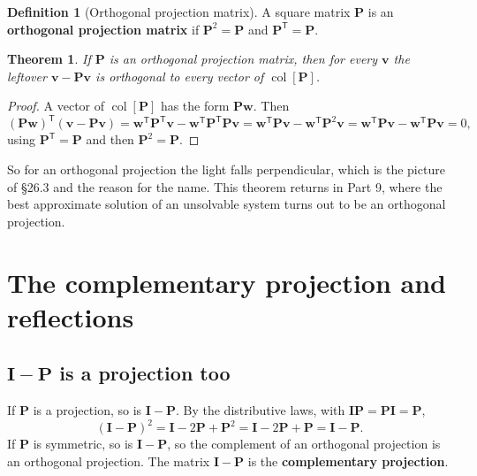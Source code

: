 \documentclass[11pt]{article}
\theoremstyle{plain}
\newtheorem{thm}{Theorem}[section]
\theoremstyle{definition}
\newtheorem{defn}{Definition}[section]
\theoremstyle{remark}
\newcommand{\vc}[1]{\mathbf{#1}}
\newcommand{\mt}[1]{\mathbf{#1}}
\newcommand{\T}{^{\mathsf{T}}}
\newcommand{\colsp}[1]{\operatorname{col}[#1]}
\begin{document}
\begin{defn}[Orthogonal projection matrix]
A square matrix $\mt{P}$ is an \textbf{orthogonal projection matrix} if
$\mt{P}^{2}=\mt{P}$ and $\mt{P}\T=\mt{P}$.
\end{defn}

\begin{thm}
\label{thm:orthproj}
If $\mt{P}$ is an orthogonal projection matrix, then for every $\vc{v}$ the
leftover $\vc{v}-\mt{P}\vc{v}$ is orthogonal to every vector of
$\colsp{\mt{P}}$.
\end{thm}

\begin{proof}
A vector of $\colsp{\mt{P}}$ has the form $\mt{P}\vc{w}$. Then
\[
  (\mt{P}\vc{w})\T(\vc{v}-\mt{P}\vc{v})
  =\vc{w}\T\mt{P}\T\vc{v}-\vc{w}\T\mt{P}\T\mt{P}\vc{v}
  =\vc{w}\T\mt{P}\vc{v}-\vc{w}\T\mt{P}^{2}\vc{v}
  =\vc{w}\T\mt{P}\vc{v}-\vc{w}\T\mt{P}\vc{v}=0,
\]
using $\mt{P}\T=\mt{P}$ and then $\mt{P}^{2}=\mt{P}$.
\end{proof}

\noindent So for an orthogonal projection the light falls perpendicular, which
is the picture of \S26.3 and the reason for the name. This theorem returns in
Part 9, where the best approximate solution of an unsolvable system turns out to
be an orthogonal projection.

\section{The complementary projection and reflections}

\subsection{\texorpdfstring{$\mt{I}-\mt{P}$}{I - P} is a projection too}
If $\mt{P}$ is a projection, so is $\mt{I}-\mt{P}$. By the distributive laws,
with $\mt{I}\mt{P}=\mt{P}\mt{I}=\mt{P}$,
\[
  (\mt{I}-\mt{P})^{2}=\mt{I}-2\mt{P}+\mt{P}^{2}=\mt{I}-2\mt{P}+\mt{P}=\mt{I}-\mt{P} .
\]
If $\mt{P}$ is symmetric, so is $\mt{I}-\mt{P}$, so the complement of an
orthogonal projection is an orthogonal projection. The matrix $\mt{I}-\mt{P}$ is
the \textbf{complementary projection}.
\end{document}
